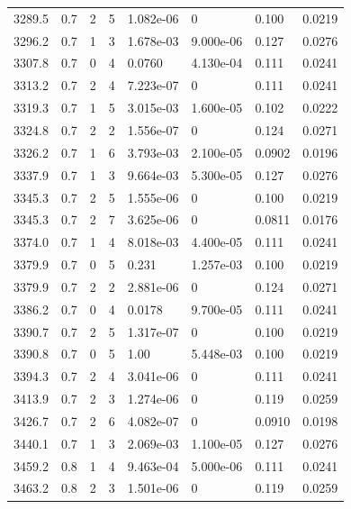 \documentclass[preview]{standalone}
\begin{document}
{{{{{{{{\begin{tabular}{L{1.2cm}C{1.2cm} C{0.3cm}C{0.5cm} C{1.4cm}C{1.4cm} C{1.4cm}C{1.4cm}}
  3289.5  &   0.7  & 2     &  5 &  1.082e-06  & 0  & 0.100 &  0.0219   \\ 
  3296.2  &   0.7  & 1     &  3 &  1.678e-03  & 9.000e-06  & 0.127 &  0.0276   \\ 
  3307.8  &   0.7  & 0     &  4 &  0.0760  & 4.130e-04  & 0.111 &  0.0241   \\ 
  3313.2  &   0.7  & 2     &  4 &  7.223e-07  & 0  & 0.111 &  0.0241   \\ 
  3319.3  &   0.7  & 1     &  5 &  3.015e-03  & 1.600e-05  & 0.102 &  0.0222   \\ 
  3324.8  &   0.7  & 2     &  2 &  1.556e-07  & 0  & 0.124 &  0.0271   \\ 
  3326.2  &   0.7  & 1     &  6 &  3.793e-03  & 2.100e-05  & 0.0902 &  0.0196   \\ 
  3337.9  &   0.7  & 1     &  3 &  9.664e-03  & 5.300e-05  & 0.127 &  0.0276   \\ 
  3345.3  &   0.7  & 2     &  5 &  1.555e-06  & 0  & 0.100 &  0.0219   \\ 
  3345.3  &   0.7  & 2     &  7 &  3.625e-06  & 0  & 0.0811 &  0.0176   \\ 
  3374.0  &   0.7  & 1     &  4 &  8.018e-03  & 4.400e-05  & 0.111 &  0.0241   \\ 
  3379.9  &   0.7  & 0     &  5 &  0.231  & 1.257e-03  & 0.100 &  0.0219   \\ 
  3379.9  &   0.7  & 2     &  2 &  2.881e-06  & 0  & 0.124 &  0.0271   \\ 
  3386.2  &   0.7  & 0     &  4 &  0.0178  & 9.700e-05  & 0.111 &  0.0241   \\ 
  3390.7  &   0.7  & 2     &  5 &  1.317e-07  & 0  & 0.100 &  0.0219   \\ 
  3390.8  &   0.7  & 0     &  5 &  1.00  & 5.448e-03  & 0.100 &  0.0219   \\ 
  3394.3  &   0.7  & 2     &  4 &  3.041e-06  & 0  & 0.111 &  0.0241   \\ 
  3413.9  &   0.7  & 2     &  3 &  1.274e-06  & 0  & 0.119 &  0.0259   \\ 
  3426.7  &   0.7  & 2     &  6 &  4.082e-07  & 0  & 0.0910 &  0.0198   \\ 
  3440.1  &   0.7  & 1     &  3 &  2.069e-03  & 1.100e-05  & 0.127 &  0.0276   \\ 
  3459.2  &   0.8  & 1     &  4 &  9.463e-04  & 5.000e-06  & 0.111 &  0.0241   \\ 
  3463.2  &   0.8  & 2     &  3 &  1.501e-06  & 0  & 0.119 &  0.0259   \\ 

\end{tabular}}}}}}}}}
\end{document}
